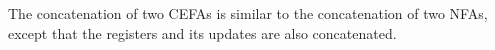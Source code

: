 \documentclass[runningheads]{llncs}
\newcommand*{\red}[1]{\textcolor{red}{#1}}
\newcommand*{\myvec}[1]{\vec{#1}}
\newcommand*{\aut}{\mathcal{A}}
\begin{document}
The concatenation of two CEFAs is similar to the concatenation of two NFAs, except that the registers and its updates are also concatenated. 

\end{document}

